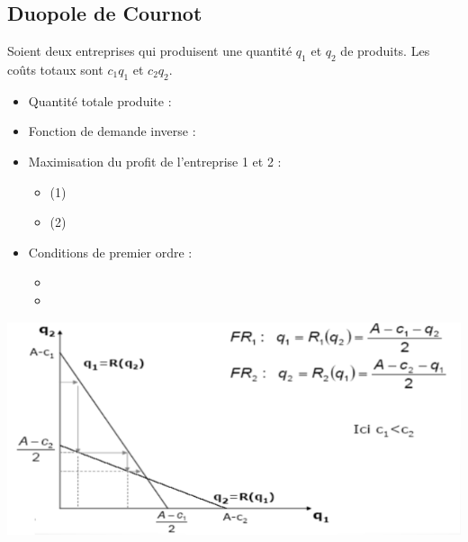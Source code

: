\subsection{Duopole de Cournot}
Soient deux entreprises qui produisent une quantité $q_{1}$ et $q_{2}$ de produits. Les coûts totaux sont $c_{1}q_{1}$ et $c_{2}q_{2}$.
\begin{itemize}
    \item Quantité totale produite : 
        \begin{center}
            \Large{}
        \end{center}
    \item Fonction de demande inverse :
    \begin{center}
        \Large{}
    \end{center}
    \item Maximisation du profit de l'entreprise 1 et 2 :
        \begin{center}
            \begin{itemize}
                \item \Large{ (1)}
                \item \Large{ (2)}
            \end{itemize}
        \end{center}
    \item Conditions de premier ordre :
    \begin{center}
            \begin{itemize}
                \item \Large{}
                \item \Large{}
            \end{itemize}
    \end{center}
\end{itemize}
\includegraphics[scale=0.8]{Pics/Duopole_cournot.png}
\newpage
